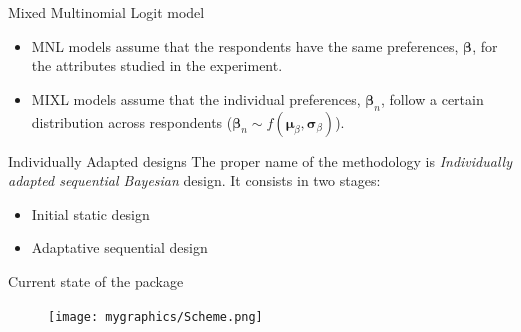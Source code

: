 \documentclass[11pt,t]{beamer}
\begin{document}
\begin{frame}[fragile]{Mixed Multinomial Logit model}
	\begin{itemize}
		\item MNL models assume that the respondents have the same preferences, $\pmb{\beta}$, for the attributes studied in the experiment.
		\item MIXL models assume that the individual preferences, $\pmb{\beta}_n$, follow a certain distribution across respondents ($\pmb{\beta}_n \sim f(\pmb{\mu}_\beta,\pmb{\sigma}_\beta)$).
	\end{itemize}
	

	\begin{block}{Individually Adapted designs}
		The proper name of the methodology is \textit{Individually adapted sequential Bayesian} design. It consists in two stages:
		\begin{itemize}
		\item Initial static design %
		\item Adaptative sequential design %
		\end{itemize}
		\end{block}
\end{frame}

\begin{frame}[fragile]{Current state of the package}

\begin{figure}
			\centering
			\texttt{[image: mygraphics/Scheme.png]}
		\end{figure}
\end{frame}
\end{document}
